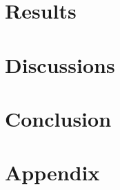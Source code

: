\documentclass[11pt,a4paper,]{article}
\begin{document}
\hypertarget{results}{%
\section{Results}\label{results}}

\hypertarget{discussions}{%
\section{Discussions}\label{discussions}}

\hypertarget{conclusion}{%
\section{Conclusion}\label{conclusion}}

\hypertarget{appendix}{%
\section{Appendix}\label{appendix}}

\newpage

\printbibliography[title=Reference]
\end{document}
